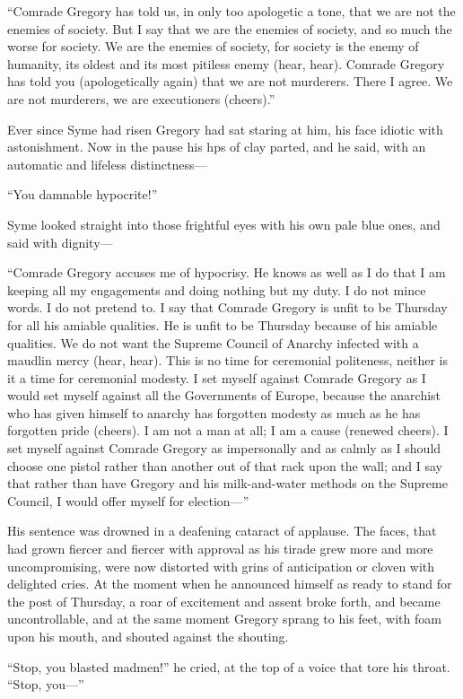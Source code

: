 \documentclass{book}
\begin{document}
“Comrade Gregory has told us, in only too apologetic a tone, that we are not the enemies of society. But I say that we are the enemies of society, and so much the worse for society. We are the enemies of society, for society is the enemy of humanity, its oldest and its most pitiless enemy (hear, hear). Comrade Gregory has told you (apologetically again) that we are not murderers. There I agree. We are not murderers, we are executioners (cheers).”

Ever since Syme had risen Gregory had sat staring at him, his face idiotic with astonishment. Now in the pause his hps of clay parted, and he said, with an automatic and lifeless distinctness—

“You damnable hypocrite!”

Syme looked straight into those frightful eyes with his own pale blue ones, and said with dignity—

“Comrade Gregory accuses me of hypocrisy. He knows as well as I do that I am keeping all my engagements and doing nothing but my duty. I do not mince words. I do not pretend to. I say that Comrade Gregory is unfit to be Thursday for all his amiable qualities. He is unfit to be Thursday because of his amiable qualities. We do not want the Supreme Council of Anarchy infected with a maudlin mercy (hear, hear). This is no time for ceremonial politeness, neither is it a time for ceremonial modesty. I set myself against Comrade Gregory as I would set myself against all the Governments of Europe, because the anarchist who has given himself to anarchy has forgotten modesty as much as he has forgotten pride (cheers). I am not a man at all; I am a cause (renewed cheers). I set myself against Comrade Gregory as impersonally and as calmly as I should choose one pistol rather than another out of that rack upon the wall; and I say that rather than have Gregory and his milk-and-water methods on the Supreme Council, I would offer myself for election—”

His sentence was drowned in a deafening cataract of applause. The faces, that had grown fiercer and fiercer with approval as his tirade grew more and more uncompromising, were now distorted with grins of anticipation or cloven with delighted cries. At the moment when he announced himself as ready to stand for the post of Thursday, a roar of excitement and assent broke forth, and became uncontrollable, and at the same moment Gregory sprang to his feet, with foam upon his mouth, and shouted against the shouting.

“Stop, you blasted madmen!” he cried, at the top of a voice that tore his throat. “Stop, you—”
\end{document}
